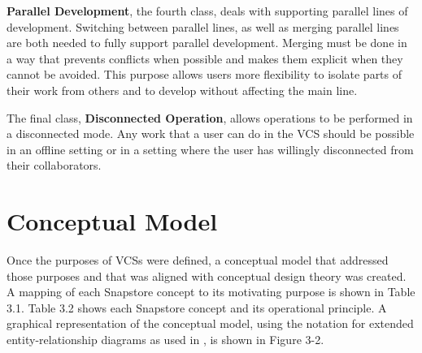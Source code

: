 \textbf{Parallel Development}, the fourth class, deals with supporting parallel lines of development. Switching between parallel lines, as well as merging parallel lines are both needed to fully support parallel development. Merging must be done in a way that prevents conflicts when possible and makes them explicit when they cannot be avoided. This purpose allows users more flexibility to isolate parts of their work from others and to develop without affecting the main line.

The final class, \textbf{Disconnected Operation}, allows operations to be performed in a disconnected mode. Any work that a user can do in the VCS should be possible in an offline setting or in a setting where the user has willingly disconnected from their collaborators.

\section{Conceptual Model}

Once the purposes of VCSs were defined, a conceptual model that addressed those purposes and that was aligned with conceptual design theory \cite{Jackson} was created. A mapping of each Snapstore concept to its motivating purpose is shown in Table 3.1. Table 3.2 shows each Snapstore concept and its operational principle. A graphical representation of the conceptual model, using the notation for extended entity-relationship diagrams as used in \cite{Jackson}, is shown in Figure 3-2.

